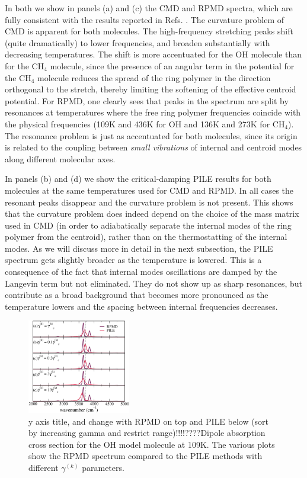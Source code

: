 \documentclass[aps,prb,superscriptaddress,amsmath,amssymb,showpacs,twocolumn]{revtex4}
\begin{document}
In both we show in panels (a) and (c) the CMD and RPMD 
spectra, which are fully consistent with the results reported 
in Refs. \cite{witt+09jcp, ivanov+10jpc}.
The curvature problem of CMD is apparent for both molecules.
The high-frequency stretching peaks shift (quite dramatically)
to lower frequencies, and broaden substantially with 
decreasing temperatures.
The shift is more accentuated for the OH molecule than for the
CH$_4$ molecule, since the presence of an angular term in the potential 
for the CH$_4$ molecule reduces the spread of the ring polymer in the
direction orthogonal to the stretch, thereby limiting the 
softening of the effective centroid potential.
For RPMD, one clearly sees that peaks in the spectrum are
split by resonances at temperatures where the free ring polymer frequencies
coincide with the physical frequencies (109K and 436K for
OH and 136K and 273K for CH$_4$). The resonance
problem is just as accentuated for both molecules, since its origin is 
related to the coupling between \emph{small vibrations} of internal and centroid
modes along different molecular axes.


In panels (b) and (d) we show the critical-damping PILE results for both 
molecules at the same temperatures used for CMD and RPMD. 
In all cases the resonant peaks disappear and the curvature problem is not present. 
This shows that the curvature problem does indeed depend on the choice
of the mass matrix used in CMD (in order to adiabatically separate the 
internal modes of the ring polymer from the centroid), 
rather than on the thermostatting of the internal modes.
As we will discuss more in detail in the next subsection, the PILE
spectrum gets slightly broader as the temperature is lowered.
This is a consequence of the fact that internal modes oscillations
are damped by the Langevin term but not eliminated. They do not
show up as sharp resonances, but contribute as a broad background 
that becomes more pronounced as the temperature lowers and the
spacing between internal frequencies decreases.

\begin{figure}[htbp]
\centering
\includegraphics[width=0.4\textwidth]{figures/oh_rpmdvspiledampings_109K.pdf}
\caption{{\color{red} y axis title, and change with RPMD on top and PILE below (sort by increasing gamma and restrict range)!!!!????}Dipole absorption cross section for the OH 
model molecule at 109K. The various plots show the RPMD spectrum compared to the 
PILE methods with different $\gamma^{(k)}$ parameters.}
\label{fig:oh-rpmd-pile-dampings}
\end{figure}
\end{document}
